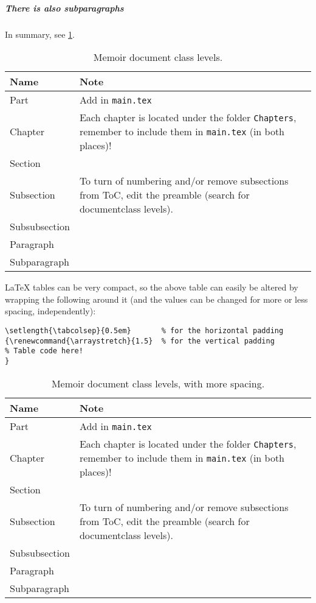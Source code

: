 \subparagraph{There is also subparagraphs} In summary, see \cref{tab:levels}.
\begin{table}[H]
    \caption{Memoir document class levels.}
    \begin{tabularx}{1\textwidth}{l|X}
        \textbf{Name} & \textbf{Note} \\ \hline
        Part & Add in \texttt{main.tex} \\
        Chapter & Each chapter is located under the folder \texttt{Chapters}, remember to include them in \texttt{main.tex} (in both places)! \\
        Section & \\
        Subsection & To turn of numbering and/or remove subsections from ToC, edit the preamble (search for documentclass levels). \\
        Subsubsection & \\
        Paragraph & \\
        Subparagraph & \\
    \end{tabularx}
    \label{tab:levels}
\end{table}

\LaTeX{} tables can be very compact, so the above table can easily be altered by wrapping the following around it (and the values can be changed for more or less spacing, independently):
\begin{verbatim}
\setlength{\tabcolsep}{0.5em}       % for the horizontal padding
{\renewcommand{\arraystretch}{1.5}  % for the vertical padding
% Table code here!
}
\end{verbatim}

\setlength{\tabcolsep}{0.5em}       %
{\renewcommand{\arraystretch}{1.5}  %
\begin{table}[H]
    \caption{Memoir document class levels, with more spacing.}
    \begin{tabularx}{1\textwidth}{l|X}
        \textbf{Name} & \textbf{Note} \\ \hline
        Part & Add in \texttt{main.tex} \\
        Chapter & Each chapter is located under the folder \texttt{Chapters}, remember to include them in \texttt{main.tex} (in both places)! \\
        Section & \\
        Subsection & To turn of numbering and/or remove subsections from ToC, edit the preamble (search for documentclass levels). \\
        Subsubsection & \\
        Paragraph & \\
        Subparagraph & \\
    \end{tabularx}
    \label{tab:levels-space}
\end{table}
}

